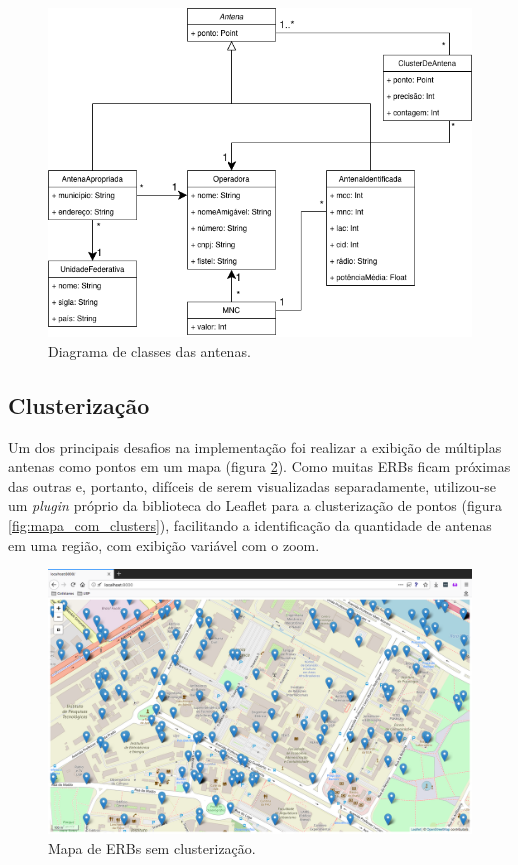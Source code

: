 \documentclass[]{politex}
\begin{document}
\begin{figure}[H]
    \centering
    \includegraphics[width=6in]{imagens/diagrama_classes_antenas}
    \caption{Diagrama de classes das antenas.}
    \label{fig:diagrama_classes_antenas}
\end{figure}

\subsection{Clusterização}

Um dos principais desafios na implementação foi realizar a exibição de múltiplas
antenas como pontos em um mapa (figura \ref{fig:mapa_sem_clusters}). Como muitas
ERBs ficam próximas das outras e, portanto, difíceis de serem visualizadas
separadamente, utilizou-se um \textit{plugin} próprio da biblioteca do Leaflet
para a clusterização de pontos (figura \ref{fig:mapa_com_clusters}), facilitando
a identificação da quantidade de antenas em uma região, com exibição variável
com o zoom.

\begin{figure}[H]
    \centering
    \includegraphics[width=6in]{imagens/mapa_sem_clusters}
    \caption{Mapa de ERBs sem clusterização.}
    \label{fig:mapa_sem_clusters}
\end{figure}
\end{document}
